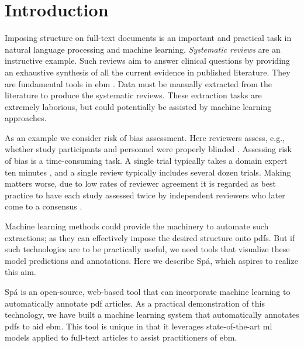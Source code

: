 \documentclass[runningheads,a4paper]{llncs}
\begin{document}
\acresetall
{}

\section{Introduction}
\label{section:intro}

Imposing structure on full-text documents is an important and practical task in natural language processing and machine learning.
\emph{Systematic reviews} are an instructive example.
Such reviews aim to answer clinical questions by providing an exhaustive synthesis of all the current evidence in published literature.
They are fundamental tools in \ac{ebm} \cite{Sackett1996,Valkenhoef2012}.
Data must be manually extracted from the literature to produce the systematic reviews.
These extraction tasks are extremely laborious, but could potentially be assisted by machine learning approaches.

As an example we consider risk of bias assessment.
Here reviewers assess, e.g., whether study participants and personnel were properly blinded \cite{Higgins2011}.
Assessing risk of bias is a time-consuming task.
A single trial typically takes a domain expert ten minutes \cite{Hartling2011}, and a single review typically includes several dozen trials.
Making matters worse, due to low rates of reviewer agreement it is regarded as best practice to have each study assessed twice by independent reviewers who later come to a consensus \cite{Hartling2009}.

Machine learning methods could provide the machinery to automate such extractions; as they can effectively impose the desired structure onto \acp{pdf}.
But if such technologies are to be practically useful, we need tools that visualize these model predictions and annotations.
Here we describe Spá, which aspires to realize this aim.

Spá is an open-source, web-based tool that can incorporate machine learning to automatically annotate \ac{pdf} articles.
As a practical demonstration of this technology, we have built a machine learning system that automatically annotates \acp{pdf} to aid \ac{ebm}.
This tool is unique in that it leverages state-of-the-art \ac{ml} models applied to full-text articles to assist practitioners of \ac{ebm}.
\end{document}
